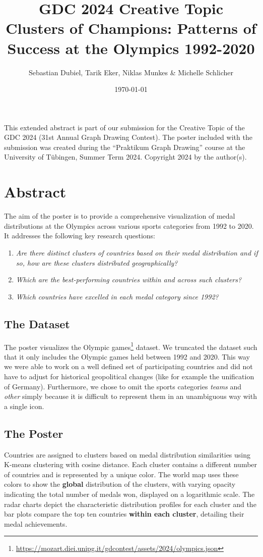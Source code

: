 \documentclass{article}
\title{
    GDC 2024 Creative Topic\\
    Clusters of Champions: Patterns of Success at the Olympics 1992-2020
}
\author{Sebastian Dubiel, Tarik Eker, Niklas Munkes \& Michelle Schlicher}
\date\today
\begin{document}
\maketitle
\begingroup
\let\cleardoublepage\relax
\let\clearpage\relax

This extended abstract is part of our submission for the Creative Topic of the GDC 2024 (31st Annual Graph Drawing Contest). The poster included with the submission was created during the ``Praktikum Graph Drawing'' course at the University of Tübingen, Summer Term 2024. Copyright 2024 by the author(s).

\section*{Abstract}
The aim of the poster is to provide a comprehensive visualization of medal distributions at the Olympics across various sports categories from 1992 to 2020. It addresses the following key research questions:
\begin{enumerate}
    \item \emph{Are there distinct clusters of countries based on their medal distribution and if so, how are these clusters distributed geographically?}
    \item \emph{Which are the best-performing countries within and across such clusters?}
    \item \emph{Which countries have excelled in each medal category since 1992?}
\end{enumerate}

\subsection*{The Dataset}
The poster visualizes the Olympic games\footnote{\url{https://mozart.diei.unipg.it/gdcontest/assets/2024/olympics.json}} dataset. We truncated the dataset such that it only includes the Olympic games held between 1992 and 2020. This way we were able to work on a well defined set of participating countries and did not have to adjust for historical geopolitical changes (like for example the unification of Germany). Furthermore, we chose to omit the sports categories \emph{teams} and \emph{other} simply because it is difficult to represent them in an unambiguous way with a single icon.

\subsection*{The Poster}
Countries are assigned to clusters based on medal distribution similarities using K-means clustering with cosine distance. Each cluster contains a different number of countries and is represented by a unique color. The world map uses these colors to show the \textbf{global} distribution of the clusters, with varying opacity indicating the total number of medals won, displayed on a logarithmic scale. The radar charts depict the characteristic distribution profiles for each cluster and the bar plots compare the top ten countries \textbf{within each cluster}, detailing their medal achievements.
\end{document}
